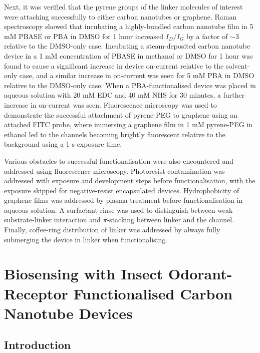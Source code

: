 \documentclass[
  a4paper,
]{scrbook}
\begin{document}
Next, it was verified that the pyrene groups of the linker molecules of
interest were attaching successfully to either carbon nanotubes or
graphene. Raman spectroscopy showed that incubating a highly-bundled
carbon nanotube film in 5 mM PBASE or PBA in DMSO for 1 hour increased
\(I_D/I_G\) by a factor of \(\sim 3\) relative to the DMSO-only case.
Incubating a steam-deposited carbon nanotube device in a 1 mM
concentration of PBASE in methanol or DMSO for 1 hour was found to cause
a significant increase in device on-current relative to the solvent-only
case, and a similar increase in on-current was seen for 5 mM PBA in DMSO
relative to the DMSO-only case. When a PBA-functionalised device was
placed in aqueous solution with 20 mM EDC and 40 mM NHS for 30 minutes,
a further increase in on-current was seen. Fluorescence microscopy was
used to demonstrate the successful attachment of pyrene-PEG to graphene
using an attached FITC probe, where immersing a graphene film in 1 mM
pyrene-PEG in ethanol led to the channels becoming brightly fluorescent
relative to the background using a 1 s exposure time.

Various obstacles to successful functionalisation were also encountered
and addressed using fluorescence microscopy. Photoresist contamination
was addressed with exposure and development steps before
functionalisation, with the exposure skipped for negative-resist
encapsulated devices. Hydrophobicity of graphene films was addressed by
plasma treatment before functionalisation in aqueous solution. A
surfactant rinse was used to distinguish between weak substrate-linker
interaction and \(\pi\)-stacking between linker and the channel.
Finally, coffee-ring distribution of linker was addressed by always
fully submerging the device in linker when functionalising.


\hypertarget{sec-biosensing-iORs}{%
\chapter{Biosensing with Insect Odorant-Receptor Functionalised Carbon
Nanotube Devices}\label{sec-biosensing-iORs}}

\hypertarget{introduction-5}{%
\section{Introduction}\label{introduction-5}}
\end{document}

